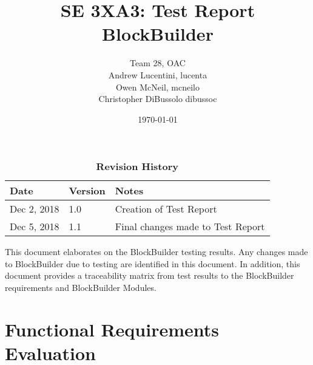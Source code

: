 \documentclass[12pt, titlepage]{article}
\title{SE 3XA3: Test Report\\BlockBuilder}
\author{Team 28, OAC
		\\ Andrew Lucentini, lucenta
		\\ Owen McNeil, mcneilo
		\\ Christopher DiBussolo dibussoc
}
\date{\today}
\begin{document}
\maketitle

\tableofcontents
\listoftables
\listoffigures

\begin{table}[bp]
\caption{\bf Revision History}
\begin{tabularx}{\textwidth}{p{3cm}p{2cm}X}
\toprule {\bf Date} & {\bf Version} & {\bf Notes}\\
\midrule
Dec 2, 2018 & 1.0 & Creation of Test Report\\
\midrule
Dec 5, 2018 & 1.1 & Final changes made to Test Report\\
\bottomrule
\end{tabularx}
\end{table}

\clearpage


This document elaborates on the BlockBuilder testing results. Any changes made to BlockBuilder due to testing are identified in this document. In addition, this document provides a traceability matrix from test results to the BlockBuilder requirements and BlockBuilder Modules.

\section{Functional Requirements Evaluation}
\end{document}
